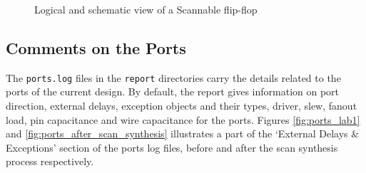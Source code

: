 \documentclass[a4paper,11pt]{article}%
\begin{document}
\begin{figure}[h]
	\centering
	\caption{Logical and schematic view of a Scannable flip-flop}
	\label{fig:sff}
\end{figure}


\pagebreak
\subsection{Comments on the Ports}



The {\tt ports.log} files in the {\tt report} directories carry the details related to the ports of the current design. By default, the report gives information on port direction, external delays, exception objects and their types, driver, slew, fanout load, pin capacitance and wire capacitance for the ports\cite{genus_command_ref_2019}. Figures \ref{fig:ports_lab1} and \ref{fig:ports_after_scan_synthesis} illustrates a part of the `External Delays \& Exceptions' section of the ports log files, before and after the scan synthesis process respectively.
\end{document}
